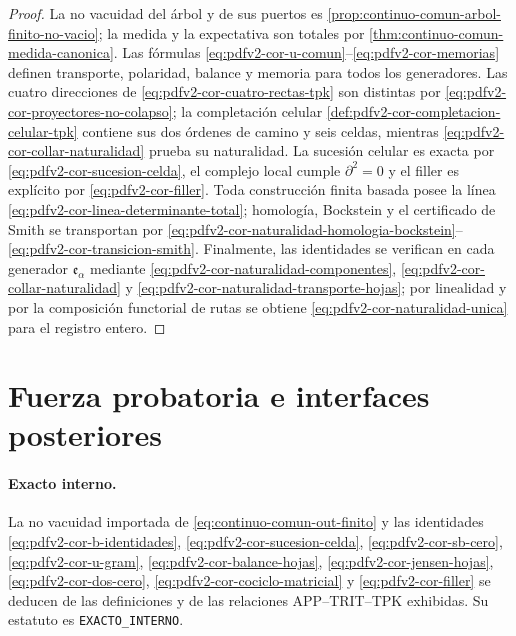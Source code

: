 \begin{proof}
La no vacuidad del árbol y de sus puertos es
\cref{prop:continuo-comun-arbol-finito-no-vacio}; la medida y la expectativa
son totales por \cref{thm:continuo-comun-medida-canonica}. Las fórmulas
  \eqref{eq:pdfv2-cor-u-comun}--\eqref{eq:pdfv2-cor-memorias} definen transporte,
polaridad, balance y memoria para todos los generadores. Las cuatro
  direcciones de \eqref{eq:pdfv2-cor-cuatro-rectas-tpk} son distintas por
  \eqref{eq:pdfv2-cor-proyectores-no-colapso}; la completación celular
  \cref{def:pdfv2-cor-completacion-celular-tpk} contiene sus dos órdenes de
  camino y seis celdas, mientras
  \eqref{eq:pdfv2-cor-collar-naturalidad} prueba su naturalidad. La
sucesión celular es exacta por \eqref{eq:pdfv2-cor-sucesion-celda}, el
complejo local cumple \(\partial^2=0\) y el filler es explícito por
\eqref{eq:pdfv2-cor-filler}. Toda construcción finita basada posee la línea
\eqref{eq:pdfv2-cor-linea-determinante-total}; homología, Bockstein y el
certificado de Smith se transportan por
\eqref{eq:pdfv2-cor-naturalidad-homologia-bockstein}--
\eqref{eq:pdfv2-cor-transicion-smith}. Finalmente, las identidades se
verifican en cada generador \(\mathfrak e_\alpha\) mediante
\eqref{eq:pdfv2-cor-naturalidad-componentes},
\eqref{eq:pdfv2-cor-collar-naturalidad} y
\eqref{eq:pdfv2-cor-naturalidad-transporte-hojas}; por linealidad y por la
composición functorial de rutas se obtiene
\eqref{eq:pdfv2-cor-naturalidad-unica} para el registro entero.
\end{proof}

\section{Fuerza probatoria e interfaces posteriores}

\paragraph{Exacto interno.}
La no vacuidad importada de \eqref{eq:continuo-comun-out-finito} y las
identidades
\eqref{eq:pdfv2-cor-b-identidades},
\eqref{eq:pdfv2-cor-sucesion-celda},
\eqref{eq:pdfv2-cor-sb-cero},
\eqref{eq:pdfv2-cor-u-gram},
\eqref{eq:pdfv2-cor-balance-hojas},
\eqref{eq:pdfv2-cor-jensen-hojas},
\eqref{eq:pdfv2-cor-dos-cero},
\eqref{eq:pdfv2-cor-cociclo-matricial} y
\eqref{eq:pdfv2-cor-filler} se deducen de las definiciones y de las relaciones
APP--TRIT--TPK exhibidas. Su estatuto es
\texttt{EXACTO\_INTERNO}.

